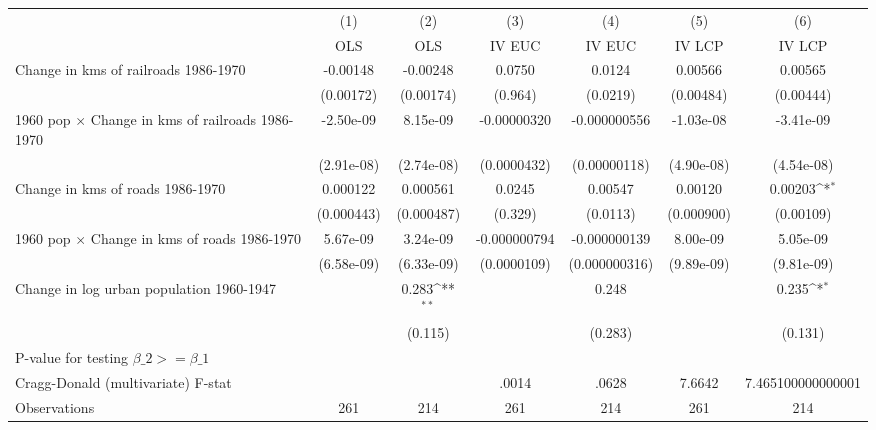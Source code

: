 {
\def\sym#1{\ifmmode^{#1}\else\(^{#1}\)\fi}
\begin{tabular}{l*{6}{c}}
\hline\hline
                &\multicolumn{1}{c}{(1)}&\multicolumn{1}{c}{(2)}&\multicolumn{1}{c}{(3)}&\multicolumn{1}{c}{(4)}&\multicolumn{1}{c}{(5)}&\multicolumn{1}{c}{(6)}\\
                &\multicolumn{1}{c}{OLS}&\multicolumn{1}{c}{OLS}&\multicolumn{1}{c}{IV EUC}&\multicolumn{1}{c}{IV EUC}&\multicolumn{1}{c}{IV LCP}&\multicolumn{1}{c}{IV LCP}\\
\hline
Change in kms of railroads 1986-1970& -0.00148         & -0.00248         &   0.0750         &   0.0124         &  0.00566         &  0.00565         \\
                &(0.00172)         &(0.00174)         &  (0.964)         & (0.0219)         &(0.00484)         &(0.00444)         \\
[1em]
1960 pop $\times$ Change in kms of railroads 1986-1970&-2.50e-09         & 8.15e-09         &-0.00000320         &-0.000000556         &-1.03e-08         &-3.41e-09         \\
                &(2.91e-08)         &(2.74e-08)         &(0.0000432)         &(0.00000118)         &(4.90e-08)         &(4.54e-08)         \\
[1em]
Change in kms of roads 1986-1970& 0.000122         & 0.000561         &   0.0245         &  0.00547         &  0.00120         &  0.00203\sym{*}  \\
                &(0.000443)         &(0.000487)         &  (0.329)         & (0.0113)         &(0.000900)         &(0.00109)         \\
[1em]
1960 pop $\times$ Change in kms of roads 1986-1970& 5.67e-09         & 3.24e-09         &-0.000000794         &-0.000000139         & 8.00e-09         & 5.05e-09         \\
                &(6.58e-09)         &(6.33e-09)         &(0.0000109)         &(0.000000316)         &(9.89e-09)         &(9.81e-09)         \\
[1em]
Change in log urban population 1960-1947&                  &    0.283\sym{**} &                  &    0.248         &                  &    0.235\sym{*}  \\
                &                  &  (0.115)         &                  &  (0.283)         &                  &  (0.131)         \\
\hline
P-value for testing $\beta\_{2} >= \beta\_{1}$&                  &                  &                  &                  &                  &                  \\
Cragg-Donald (multivariate) F-stat&                  &                  &    .0014         &    .0628         &   7.6642         &7.465100000000001         \\
Observations    &      261         &      214         &      261         &      214         &      261         &      214         \\
\hline\hline
\end{tabular}
}
